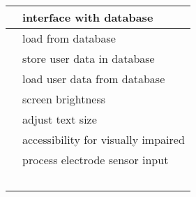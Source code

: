 \documentclass[a4paper]{article}
\begin{document}
\begin{flushleft}
\begin{supertabular}{|m{2.8899999cm}|m{8.253cm}|}
 &
{\color{black} interface with database}\\\hline
{} &
{\color{black} load from database}\\\hline
{} &
{\color{black} store user data in database}\\\hline
{} &
{\color{black} load user data from database}\\\hline
{} &
{\color{black} screen brightness}\\\hline
{} &
{\color{black} adjust text size}\\\hline
{} &
{\color{black} accessibility for visually impaired}\\\hline
{} &
{\color{black} process electrode sensor input}\\\hline
{} &
~
\\\hline
\end{supertabular}
\end{flushleft}

\bigskip
\end{document}
